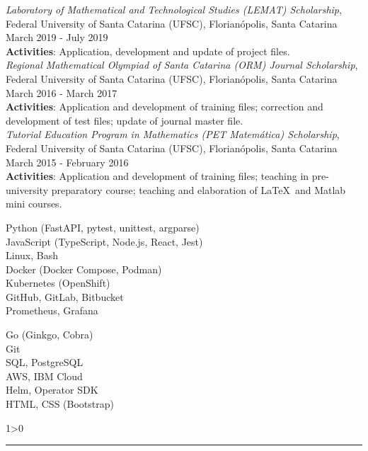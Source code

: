 \documentclass[a4paper,10pt]{article}
\newcommand{\createSection}[4][0]{
	\begin{tcolorbox}[
        blanker,
        breakable,
        title=\begin{minipage}{0.16\linewidth}\large{\textbf{#2}}\vspace{-#3\baselineskip}\end{minipage},
        coltitle=black,
        leftupper=0.21\linewidth,
    ]
        #4
		\ifnum0#1>0 { \hrule {\ } } \fi
    \end{tcolorbox}
}
\begin{document}
{		\textit{Laboratory of Mathematical and Technological Studies (LEMAT) Scholarship}, Federal University of Santa Catarina (UFSC), Florianópolis, Santa Catarina \hfill March 2019 - July 2019 \\
		\textbf{Activities}: Application, development and update of project files.\\

		\textit{Regional Mathematical Olympiad of Santa Catarina (ORM) Journal Scholarship}, Federal University of Santa Catarina (UFSC), Florianópolis, Santa Catarina \hfill March 2016 - March 2017 \\
		\textbf{Activities}: Application and development of training files; correction and development of test files; update of journal master file.\\

		\textit{Tutorial Education Program in Mathematics (PET Matemática) Scholarship}, Federal University of Santa Catarina (UFSC), Florianópolis, Santa Catarina \hfill March 2015 - February 2016 \\
		\textbf{Activities}: Application and development of training files; teaching in pre-university preparatory course; teaching and elaboration of \LaTeX\ and Matlab mini courses.\\
	}

    \createSection[1]{Programming languages and tools}{4}{
        \large{\bf
			\begin{minipage}{0.65\linewidth}
				Python (FastAPI, pytest, unittest, argparse)\\
				JavaScript (TypeScript, Node.js, React, Jest)\\
				Linux, Bash\\
				Docker (Docker Compose, Podman)\\
				Kubernetes (OpenShift)\\
				GitHub, GitLab, Bitbucket\\
				Prometheus, Grafana\\
			\end{minipage}
			\begin{minipage}{0.35\linewidth}
				Go (Ginkgo, Cobra)\\
				Git\\
				SQL, PostgreSQL\\
				AWS, IBM Cloud\\
				Helm, Operator SDK\\
				HTML, CSS (Bootstrap)\\
				\vspace{\baselineskip}
			\end{minipage}
		}
    }
\end{document}
